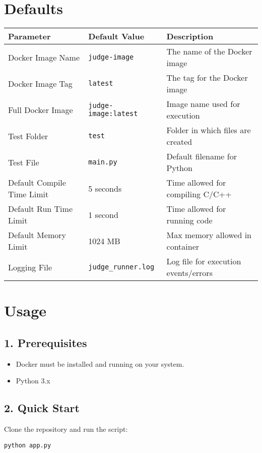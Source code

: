 \documentclass{article}
\begin{document}
\section*{Defaults}
\begin{longtable}{|p{4cm}|p{5cm}|p{6cm}|}
\hline
\textbf{Parameter} & \textbf{Default Value} & \textbf{Description} \\
\hline
Docker Image Name & \texttt{judge-image} & The name of the Docker image \\
Docker Image Tag & \texttt{latest} & The tag for the Docker image \\
Full Docker Image & \texttt{judge-image:latest} & Image name used for execution \\
Test Folder & \texttt{test} & Folder in which files are created \\
Test File & \texttt{main.py} & Default filename for Python \\
Default Compile Time Limit & 5 seconds & Time allowed for compiling C/C++ \\
Default Run Time Limit & 1 second & Time allowed for running code \\
Default Memory Limit & 1024 MB & Max memory allowed in container \\
Logging File & \texttt{judge\_runner.log} & Log file for execution events/errors \\
\hline
\end{longtable}

\section*{Usage}

\subsection*{1. Prerequisites}
\begin{itemize}
    \item Docker must be installed and running on your system.
    \item Python 3.x
\end{itemize}

\subsection*{2. Quick Start}
Clone the repository and run the script:
\begin{verbatim}
python app.py
\end{verbatim}
\end{document}
